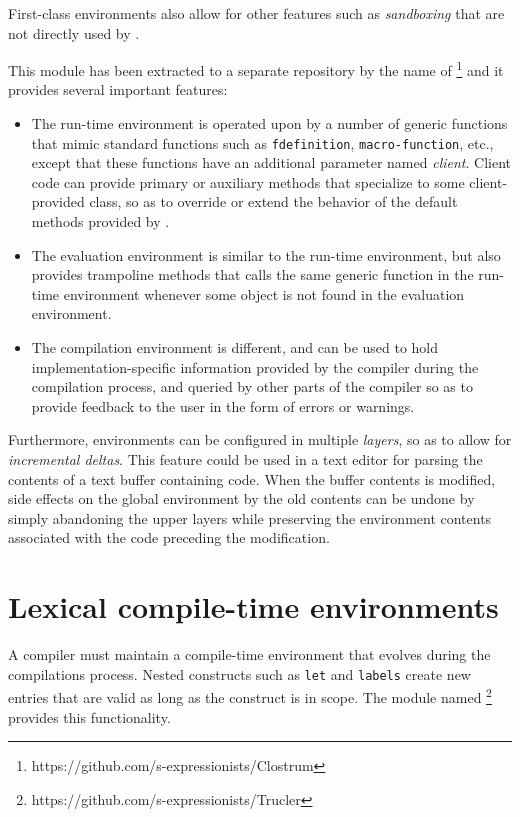 First-class environments also allow for other features such as
\emph{sandboxing} that are not directly used by \sysname{}.

This module has been extracted to a separate repository by the name of
\clostrum{}%
\footnote{https://github.com/s-expressionists/Clostrum} and it
provides several important features:

\begin{itemize}
\item The run-time environment is operated upon by a number of generic
  functions that mimic standard \commonlisp{} functions such as
  \texttt{fdefinition}, \texttt{macro-function}, etc., except that
  these functions have an additional parameter named \emph{client}.
  Client code can provide primary or auxiliary methods that specialize
  to some client-provided class, so as to override or extend the
  behavior of the default methods provided by \clostrum{}.
\item The evaluation environment is similar to the run-time
  environment, but also provides trampoline methods that calls the
  same generic function in the run-time environment whenever some
  object is not found in the evaluation environment.
\item The compilation environment is different, and can be used to
  hold imple\-mentation-specific information provided by the compiler
  during the compilation process, and queried by other parts of the
  compiler so as to provide feedback to the user in the form of errors
  or warnings.
\end{itemize}

Furthermore, \clostrum{} environments can be configured in multiple
\emph{layers}, so as to allow for \emph{incremental deltas}.  This
feature could be used in a text editor for parsing the contents of a
text buffer containing \commonlisp{} code.  When the buffer contents
is modified, side effects on the global environment by the old
contents can be undone by simply abandoning the upper layers while
preserving the environment contents associated with the code preceding
the modification.

\section{Lexical compile-time environments}
\label{sec-lexical-compile-time-environments}

A \commonlisp{} compiler must maintain a compile-time environment that
evolves during the compilations process.  Nested constructs such as
\texttt{let} and \texttt{labels} create new entries that are valid as
long as the construct is in scope. The module named \trucler{}%
\footnote{https://github.com/s-expressionists/Trucler} provides this
functionality.

